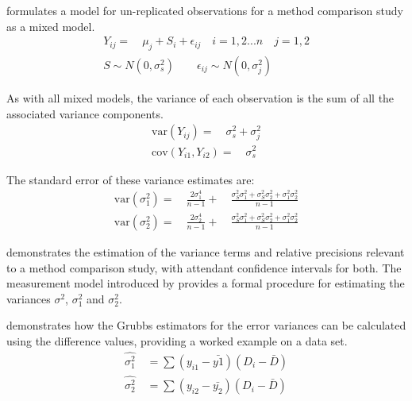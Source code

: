 \documentclass[12pt, a4paper]{report}
\theoremstyle{plain}
\theoremstyle{definition}
\theoremstyle{remark}
\begin{document}
	
	\citet{Kinsella} formulates a model for un-replicated observations
	for a method comparison study as a mixed model.
	\begin{eqnarray}
	Y_{ij} =\quad \mu_{j} + S_{i} + \epsilon_{ij} \quad i=1,2...n\quad
	j=1,2\\
	S \sim N(0,\sigma^{2}_{s})\qquad \epsilon_{ij} \sim
	N(0,\sigma^{2}_{j}) \nonumber
	\end{eqnarray}
	
	As with all mixed models, the variance of each observation is the
	sum of all the associated variance components.
	\begin{eqnarray}
	\textrm{var}(Y_{ij}) =\quad \sigma^{2}_{s} + \sigma^{2}_{j} \\
	\textrm{cov}(Y_{i1},Y_{i2})=\quad \sigma^{2}_{s} \nonumber
	\end{eqnarray}
	
	
	The standard error of these variance estimates are:
	\begin{eqnarray}
	\textrm{var}(\sigma^{2}_{1}) =\quad \frac{2\sigma^{4}_{1}}{n-1} +\quad
	\frac{\sigma^2_{S}\sigma^2_{1}+\sigma^2_{S}\sigma^2_{2}+\sigma^2_{1}\sigma^2_{2}
	}{n-1}\\
	\textrm{var}(\sigma^{2}_{2}) =\quad \frac{2\sigma^{4}_{2}}{n-1} +\quad
	\frac{\sigma^2_{S}\sigma^2_{1}+\sigma^2_{S}\sigma^2_{2}+\sigma^2_{1}\sigma^2_{2}
	}{n-1}\nonumber
	\end{eqnarray}
	
	\citet{Kinsella} demonstrates the estimation of the variance terms and relative precisions relevant to a method comparison study, with attendant confidence intervals for both. The measurement model introduced by \citet{Grubbs48,Grubbs73} provides a formal procedure for estimating the variances $\sigma^2$, $\sigma^2_{1}$ and $\sigma^2_{2}$. 
	
	
	\citet{kinsella} demonstrates how the Grubbs estimators for the
	error variances can be calculated using the difference values,
	providing a worked example on a data set.
	\begin{eqnarray}
	\hat{\sigma^{2}_{1}}
	\quad=\sum{(y_{i1}-\bar{y{1}})(D_{i}-\bar{D})}\\
	\hat{\sigma^{2}_{2}} \quad=
	\sum{(y_{i2}-\bar{y_{2}})(D_{i}-\bar{D})} \nonumber
	\end{eqnarray}
	
\end{document}

